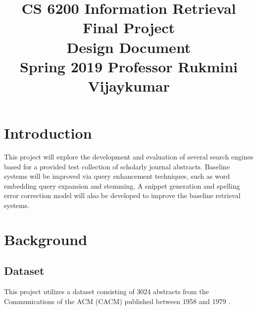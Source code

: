 \documentclass[conference]{IEEEtran}
\begin{document}
\title{CS 6200 Information Retrieval Final Project\\
Design Document\\
{\footnotesize Spring 2019 \textemdash Professor Rukmini Vijaykumar}
}

\author{
\and
{}
\and
{}
}

\maketitle

\section{Introduction}
This project will explore the development and evaluation of several search engines based for a provided test collection of scholarly journal abstracts. Baseline systems will be improved via query enhancement techniques, such as word embedding query expansion and stemming. A snippet generation and spelling error correction model will also be developed to improve the baseline retrieval systems.

\section{Background}
\subsection{Dataset}
This project utilizes a dataset consisting of 3024 abstracts from the Communications of the ACM (CACM) published between 1958 and 1979 \cite{croftsearch}. 
\end{document}
